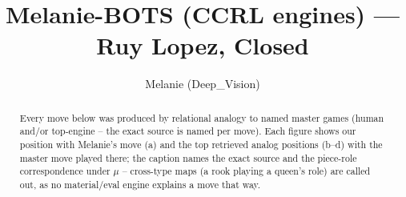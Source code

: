 \documentclass[11pt]{article}
\title{Melanie-BOTS (CCRL engines) — Ruy Lopez, Closed}
\author{Melanie (Deep\_Vision)}
\date{}
\begin{document}
\maketitle

\begin{abstract}Every move below was produced by relational analogy to named master games (human and/or top-engine -- the exact source is named per move). Each figure shows our position with Melanie's move (a) and the top retrieved analog positions (b--d) with the master move played there; the caption names the exact source and the piece-role correspondence under $\mu$ -- cross-type maps (a rook playing a queen's role) are called out, as no material/eval engine explains a move that way.\end{abstract}

\begin{figure}[p]\centering
\begin{subfigure}{0.46\textwidth}\centering
\resizebox{\linewidth}{!}{%
\newchessgame
\chessboard[
  setfen={r1bqk2r/2p1bppp/p1np1n2/1p2p3/P3P3/1B3N2/1PPP1PPP/RNBQR1K1 b kq - 0 8},
  showmover=false,
  pgfstyle=straightmove, color=movearrow, markmove={c8-d7}
]}
\caption{}
\end{subfigure}\hfill
\begin{subfigure}{0.46\textwidth}\centering
\resizebox{\linewidth}{!}{%
\newchessgame
\chessboard[
  setfen={r1bqk2r/2p1bppp/p1np1n2/1p2p3/P3P3/1B3N2/1PPP1PPP/RNBQR1K1 b kq - 0 8},
  showmover=false,
  pgfstyle=straightmove, color=movearrow, markmove={c8-d7}
]}
\caption{}
\end{subfigure}
\\[4pt]
\begin{subfigure}{0.46\textwidth}\centering
\resizebox{\linewidth}{!}{%
\newchessgame
\chessboard[
  setfen={r1bqk2r/2p1bppp/p1np1n2/1p2p3/P3P3/1B3N2/1PPP1PPP/RNBQR1K1 b kq - 0 8},
  showmover=false,
  pgfstyle=straightmove, color=movearrow, markmove={c8-d7}
]}
\caption{}
\end{subfigure}\hfill
\begin{subfigure}{0.46\textwidth}\centering
\resizebox{\linewidth}{!}{%
\newchessgame
\chessboard[
  setfen={r1bqk2r/2p1bppp/p1np1n2/1p2p3/P3P3/1B3N2/1PPP1PPP/RNBQR1K1 b kq - 0 8},
  showmover=false,
  pgfstyle=straightmove, color=movearrow, markmove={c8-b7}
]}
\caption{}
\end{subfigure}

\end{figure}
\end{document}
